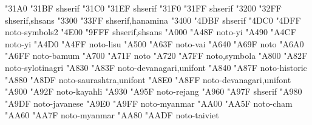 \documentclass{article}
\begin{document}
                              {  "31A0} {  "31BF} {shserif}
                                    {  "31C0} {  "31EF} {shserif}
                   {  "31F0} {  "31FF} {shserif}
                {  "3200} {  "32FF} {shserif,shsans}
                              {  "3300} {  "33FF} {shserif,hanamina}
             {  "3400} {  "4DBF} {shserif}
                        {  "4DC0} {  "4DFF} {noto-symbols2}
                         {  "4E00} {  "9FFF} {shserif,shsans}
                                   {  "A000} {  "A48F} {noto-yi}
                                    {  "A490} {  "A4CF} {noto-yi}
                                           {  "A4D0} {  "A4FF} {noto-lisu}
                                            {  "A500} {  "A63F} {noto-vai}
                            {  "A640} {  "A69F} {noto}
                                          {  "A6A0} {  "A6FF} {noto-bamum}
                          {  "A700} {  "A71F} {noto}
                               {  "A720} {  "A7FF} {noto,symbola}
                                   {  "A800} {  "A82F} {noto-sylotinagri}
                      {  "A830} {  "A83F} {noto-devanagari,unifont}
                                       {  "A840} {  "A87F} {noto-historic}
                                     {  "A880} {  "A8DF} {noto-saurashtra,unifont}
                            {  "A8E0} {  "A8FF} {noto-devanagari,unifont}
                                       {  "A900} {  "A92F} {noto-kayahli}
                                         {  "A930} {  "A95F} {noto-rejang}
                         {  "A960} {  "A97F} {shserif}
                                       {  "A980} {  "A9DF} {noto-javanese}
                             {  "A9E0} {  "A9FF} {noto-myanmar}
                                           {  "AA00} {  "AA5F} {noto-cham}
                             {  "AA60} {  "AA7F} {noto-myanmar}
                                       {  "AA80} {  "AADF} {noto-taiviet}
\end{document}
